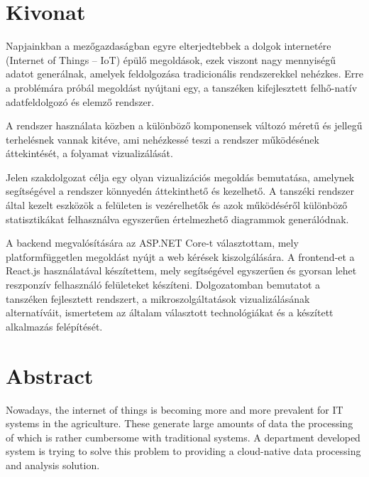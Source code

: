 \setcounter{page}{1}

\selecthungarian

\chapter*{Kivonat}

Napjainkban a mezőgazdaságban egyre elterjedtebbek a dolgok internetére (Internet of Things
– IoT) épülő megoldások, ezek viszont nagy mennyiségű adatot generálnak, amelyek
feldolgozása tradicionális rendszerekkel nehézkes. Erre a problémára próbál megoldást
nyújtani egy, a tanszéken kifejlesztett felhő-natív adatfeldolgozó és elemző rendszer.

A rendszer használata közben a különböző komponensek változó méretű és jellegű
terhelésnek vannak kitéve, ami nehézkessé teszi a rendszer működésének áttekintését, a
folyamat vizualizálását. 

Jelen szakdolgozat célja egy olyan vizualizációs megoldás bemutatása, amelynek segítségével a rendszer könnyedén áttekinthető
és kezelhető. A tanszéki rendszer által kezelt eszközök a felületen is vezérelhetők 
és azok működéséről különböző statisztikákat felhasználva egyszerűen értelmezhető diagrammok generálódnak.

A backend megvalósítására az ASP.NET Core-t választottam, mely platformfüggetlen megoldást nyújt a web kérések kiszolgálására.
A frontend-et a React.js használatával készítettem, mely segítségével egyszerűen és gyorsan lehet reszponzív felhasználó felületeket készíteni.
Dolgozatomban bemutatot a tanszéken fejlesztett rendszert, a mikroszolgáltatások vizualizálásának alternatíváit,
ismertetem az általam választott technológiákat és a készített alkalmazás felépítését.

\vfill
\selectenglish


\chapter*{Abstract}

Nowadays, the internet of things is becoming more and more prevalent for IT systems in the agriculture.
These generate large amounts of data the processing of which is rather cumbersome with traditional systems. 
A department developed system is trying to solve this problem to providing a cloud-native data processing and analysis solution.

